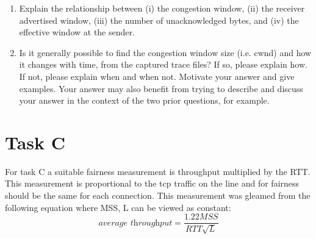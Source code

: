 \documentclass[10pt]{article}
\begin{document}
\begin{enumerate}
  \item{Explain the relationship between (i) the congestion window, (ii) the
  receiver advertised window, (iii) the number of unacknowledged bytes, and (iv)
  the effective window at the sender.}
  \item{Is it generally
  possible to find the congestion window size (i.e. cwnd) and how it changes with
  time, from the captured trace files? If so, please explain how. If not, please
  explain when and when not. Motivate your answer and give examples. Your answer
  may also benefit from trying to describe and discuss your answer in the context
  of the two prior questions, for example.}
\end{enumerate}

\section{Task C}
For task C a suitable fairness measurement is throughput multiplied by the RTT.
This measurement is proportional to the tcp traffic on the line and for fairness
should be the same for each connection. This measurement was gleamed from the
following equation where MSS, L can be viewed as constant:
\begin{equation}
\textit{average throughput} = \frac{1.22MSS}{RTT\sqrt{L}}
\end{equation}
\end{document}
